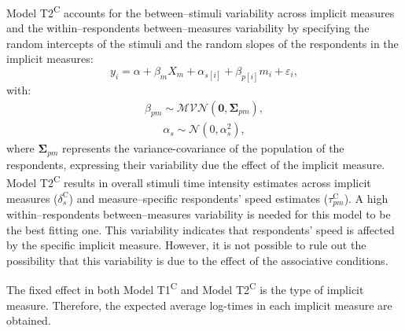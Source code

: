 \documentclass[12pt]{book}
\begin{document}
Model T2\textsuperscript{C} accounts for the between--stimuli variability across implicit measures and the within--respondents between--measures variability by specifying the random intercepts of the stimuli and the random slopes of the respondents in the implicit measures: 
%
\begin{equation}\label{eq:type1t}
	y_{i} = \alpha + \beta_mX_m + \alpha_{s[i]} +  \beta_{p[i]}m_{i} + \varepsilon_{i},
\end{equation}
with:
\begin{align}
	\beta_{pm} \sim \mathcal{MVN}(\bm{0}, \bm{\Sigma}_{pm}),
\end{align}
\begin{align}
	\alpha_s \sim \mathcal{N} (0, \alpha_s^2),
\end{align}
where $\bm{\Sigma}_{pm}$ represents the variance-covariance of the population of the respondents, expressing their variability due the effect of the implicit measure. 
Model T2\textsuperscript{C} results in overall stimuli time intensity estimates across implicit measures ($\delta_s^\text{C}$) and measure--specific respondents' speed estimates ($\tau_{pm}^\text{C}$). 
A high within--respondents between--measures variability is needed for this model to be the best fitting one. This variability indicates that respondents' speed is affected by the specific implicit measure. However, it is not possible to rule out the possibility that this variability is due to the effect of the associative conditions.

The fixed effect in both Model T1\textsuperscript{C} and Model T2\textsuperscript{C} is the type of implicit measure. Therefore, the expected average log-times in each implicit measure are obtained. 
\end{document}
